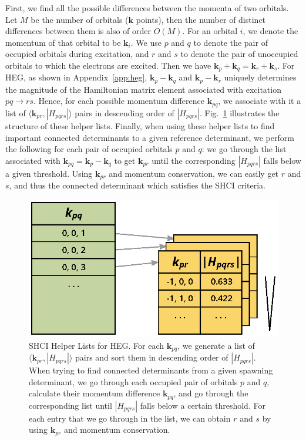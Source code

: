 First, we find all the possible differences between the momenta of two orbitals.
Let $M$ be the number of orbitals ($\mathbf{k}$ points), then the number of distinct differences between them is also of order $O(M)$.
For an orbital $i$, we denote the momentum of that orbital to be $\mathbf{k}_{i}$.
We use $p$ and $q$ to denote the pair of occupied orbitals during excitation, and $r$ and $s$ to denote the pair of unoccupied orbitals to which the electrons are excited.
Then we have $\mathbf{k}_p + \mathbf{k}_q = \mathbf{k}_r + \mathbf{k}_s$.
For HEG, as shown in Appendix~\ref{app:heg}, $\mathbf{k}_p - \mathbf{k}_q$ and $\mathbf{k}_p - \mathbf{k}_r$ uniquely determines the magnitude of the Hamiltonian matrix element associated with excitation $pq\to rs$.
Hence, for each possible momentum difference $\mathbf{k}_{pq}$, we associate with it a list of $\langle \mathbf{k}_{pr}, |H_{pqrs}|\rangle$ pairs in descending order of $|H_{pqrs}|$.
Fig.~\ref{fig:helper} illustrates the structure of these helper lists.
Finally, when using these helper lists to find important connected determinants to a given reference determinant, we perform the following for each pair of occupied orbitals $p$ and $q$: we go through the list associated with $\mathbf{k}_{pq} = \mathbf{k}_p - \mathbf{k}_q$ to get $\mathbf{k}_{pr}$ until the corresponding $|H_{pqrs}|$ falls below a given threshold.
Using $\mathbf{k}_{pr}$ and momentum conservation, we can easily get $r$ and $s$, and thus the connected determinant which satisfies the SHCI criteria.
\begin{figure}
  \begin{center}
  \includegraphics[width=0.9\linewidth]{figs/HelperList.eps}
  \end{center}
  \vspace{-0.2cm}
  \caption{SHCI Helper Lists for HEG.
  For each $\mathbf{k}_{pq}$, we generate a list of $\langle \mathbf{k}_{pr}, |H_{pqrs}|\rangle$ pairs and sort them in descending order of $|H_{pqrs}|$.
  When trying to find connected determinants from a given spawning determinant, we go through each occupied pair of orbitals $p$ and $q$, calculate their momentum difference $\mathbf{k}_{pq}$, and go through the corresponding list until $|H_{pqrs}|$ falls below a certain threshold.
  For each entry that we go through in the list, we can obtain $r$ and $s$ by using $\mathbf{k}_{pr}$ and momentum conservation.
  }
  \label{fig:helper}
\end{figure}

